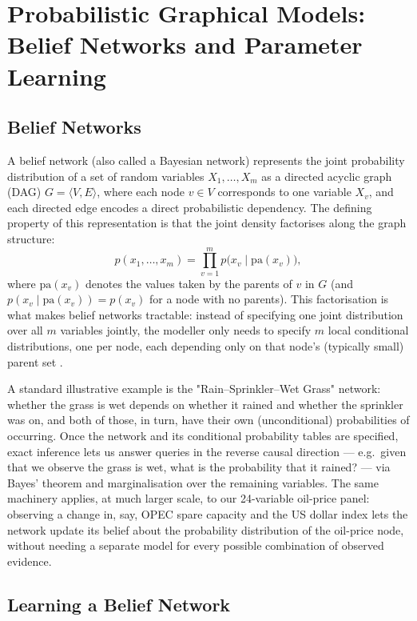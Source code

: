 \section{Probabilistic Graphical Models: Belief Networks and Parameter Learning}
\label{sec:pgm-fundamentals}

\subsection{Belief Networks}

A belief network (also called a Bayesian network) represents the joint
probability distribution of a set of random variables $X_1, \ldots, X_m$ as a
directed acyclic graph (DAG) $G = \langle V, E \rangle$, where each node
$v \in V$ corresponds to one variable $X_v$, and each directed edge encodes a
direct probabilistic dependency. The defining property of this representation
is that the joint density factorises along the graph structure:
\[
  p(x_1, \ldots, x_m) = \prod_{v=1}^{m} p\bigl(x_v \mid \mathrm{pa}(x_v)\bigr),
\]
where $\mathrm{pa}(x_v)$ denotes the values taken by the parents of $v$ in
$G$ (and $p(x_v \mid \mathrm{pa}(x_v)) = p(x_v)$ for a node with no parents).
This factorisation is what makes belief networks tractable: instead of
specifying one joint distribution over all $m$ variables jointly, the modeller
only needs to specify $m$ local conditional distributions, one per
node, each depending only on that node's (typically small) parent set
\autocite{pearl1988probabilistic,koller2009pgm}.

A standard illustrative example is the "Rain--Sprinkler--Wet Grass" network:
whether the grass is wet depends on whether it rained and whether the
sprinkler was on, and both of those, in turn, have their own (unconditional)
probabilities of occurring. Once the network and its conditional probability
tables are specified, exact inference lets us answer queries in the reverse
causal direction — e.g.\ given that we observe the grass is wet, what
is the probability that it rained? — via Bayes' theorem and marginalisation
over the remaining variables. The same machinery applies, at much larger
scale, to our 24-variable oil-price panel: observing a change in, say, OPEC
spare capacity and the US dollar index lets the network update its belief
about the probability distribution of the oil-price node, without needing a
separate model for every possible combination of observed evidence.

\subsection{Learning a Belief Network}

